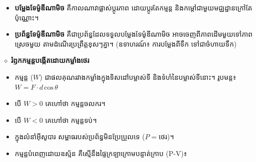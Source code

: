 	\begin{itemize}
		\item \textbf{បម្លែងទែម៉ូឌីណាមិច} គឺកាលណាវាផ្លាស់ប្តូរភាព ដោយប្តូរតែកម្មន្ត និងកម្ដៅជាមួយមជ្ឈដ្ឋានក្រៅតែប៉ុណ្ណោះ។
	\end{itemize}
	
	\begin{itemize}
		\item \textbf{ប្រព័ន្ធទែម៉ូឌីណាមិច} គឺជាប្រព័ន្ធដែលទទួលបម្លែងទែម៉ូឌីណាមិច អាចចេញពីភាពដើមមួយទៅភាពស្រេចមួយ តាមដំណើរប្រព្រឹត្តខុសៗគ្នា។ (ឧទាហរណ៍៖ ការបម្លែងពីទឹក ទៅជាចំហាយទឹក)
	\end{itemize}
	
	\vspace{0.5cm}
	
	$\diamond$ \textbf{រំឭកកម្មន្តបង្កើតដោយកម្លាំងថេរ}
	\begin{itemize}
		\item កម្មន្ត ($W$) ជាផលគុណរវាងកម្លាំងក្នុងទិសដៅបម្លាស់ទី និងទំហំនៃបម្លាស់ទីនោះ។ រូបមន្ត៖ $W = F \cdot d\,\mbox{cos}\,\theta$
		\item បើ $W > 0$ គេហៅថា កម្មន្តចលករ។
		\item បើ $W < 0$ គេហៅថា កម្មន្តទប់។
	\end{itemize}
	
\begin{itemize}
	\item ក្នុងលំនាំអ៊ីសូបារ សម្ពាធរបស់ប្រព័ន្ធមិនប្រែប្រួលទេ ($P = \mbox{ថេរ}$)។
	\item កម្មន្តបំពេញដោយឧស្ម័ន គឺស្មើនឹងផ្ទៃក្រឡាក្រោមបន្ទាត់ក្រាប (P-V)៖
\end{itemize}

